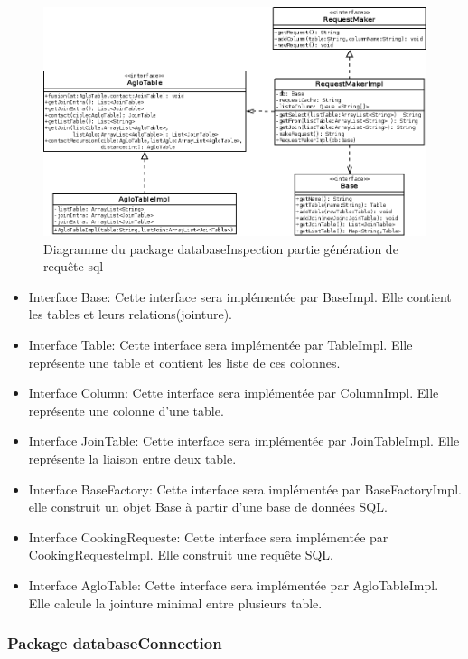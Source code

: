 \documentclass[12pt]{report}
\begin{document}
\begin{figure}[h!]
\begin{center}
\includegraphics[scale=0.5]{bduml/cookingRequeste.png}
\caption{Diagramme du package databaseInspection partie génération de requête sql}
\end{center}
\end{figure}

\begin{itemize}
\item Interface Base: Cette interface sera implémentée par BaseImpl. Elle contient les tables et leurs relations(jointure).
\item Interface Table: Cette interface sera implémentée par TableImpl. Elle représente une table et contient les liste de ces colonnes.
\item Interface Column: Cette interface sera implémentée par ColumnImpl. Elle représente une colonne d'une table.
\item Interface JoinTable: Cette interface sera implémentée par JoinTableImpl. Elle représente la liaison entre deux table.
\item Interface BaseFactory: Cette interface sera implémentée par BaseFactoryImpl. elle construit un objet Base à partir d'une base de données SQL.
\item Interface CookingRequeste: Cette interface sera implémentée par CookingRequesteImpl. Elle construit une requête SQL.
\item Interface AgloTable: Cette interface sera implémentée par AgloTableImpl. Elle calcule la jointure minimal entre plusieurs table.
\end{itemize}

\subsubsection*{Package databaseConnection}
\end{document}
